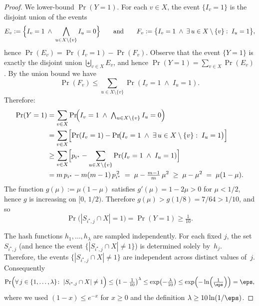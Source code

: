 \begin{proof}
We lower-bound $\Pr(Y=1)$.
For each $v\in X$, the event $\{I_v=1\}$ is the disjoint union of the events
\[
E_v := \Bigl\{I_v = 1 \;\wedge\; \bigwedge_{u\in X\setminus\{v\}} I_u=0\Bigr\}
\qquad\text{and}\qquad
F_v := \bigl\{I_v=1\;\wedge\;\exists\,u\in X\setminus\{v\}:\;I_u=1\bigr\},
\]
hence $\Pr(E_v)=\Pr(I_v=1)-\Pr(F_v)$.
Observe that the event $\{Y=1\}$ is exactly the disjoint union
$\biguplus_{v\in X} E_v$, and hence $\Pr(Y=1)=\sum_{v\in X}\Pr(E_v)$.
By the union bound we have
\[
\Pr(F_v) \le \sum_{u\in X\setminus\{v\}} \Pr(I_v=1\;\wedge\;I_u=1).
\]
Therefore:
\begin{align*}
\Pr(Y=1)
&= \sum_{v\in X} \Pr\!\Bigl(I_v=1 \;\wedge\;
\textstyle\bigwedge_{u\in X\setminus\{v\}} I_u=0\Bigr)\\
&= \sum_{v\in X}\Bigl[\Pr(I_v=1)
- \Pr\!\bigl(I_v=1\;\wedge\;\exists\,u\in X\setminus\{v\}:\;I_u=1\bigr)
\Bigr]\\
&\ge \sum_{v\in X}\Bigl[p_{i^\star}
- \sum_{u\in X\setminus\{v\}} \Pr(I_v=1 \;\wedge\; I_u=1)\Bigr]\\
&= m\,p_{i^\star} - m(m-1)\,p_{i^\star}^{\,2}
\;=\; \mu - \tfrac{m-1}{m}\,\mu^2
\;\ge\; \mu - \mu^2
\;=\; \mu(1-\mu).
\end{align*}
The function $g(\mu):=\mu(1-\mu)$ satisfies $g'(\mu)=1-2\mu > 0$ for
$\mu<1/2$, hence $g$ is increasing on $[0,\,1/2)$.
Therefore $g(\mu) > g(1/8) = 7/64 > 1/10$, and so
\[
\Pr\bigl(|S_{i^\star,j}\cap X|=1\bigr)=\Pr(Y=1)\ge \tfrac{1}{10}.
\]

The hash functions $h_1,\dots,h_\lambda$ are sampled independently.
For each fixed $j$, the set $S_{i^\star,j}$ (and hence the event
$\{|S_{i^\star,j}\cap X|\neq 1\}$) is determined solely by~$h_j$.
Therefore, the events $\{|S_{i^\star,j}\cap X|\neq 1\}$ are independent across
distinct values of~$j$.
Consequently
\[
\Pr\Bigl(\forall\, j\in\{1,\dots,\lambda\}\colon\;
|S_{i^\star,j}\cap X|\neq 1\Bigr)
\le \left(1-\tfrac{1}{10}\right)^\lambda
\le \exp\!\left(-\tfrac{\lambda}{10}\right)
\le \exp\!\left(-\ln\!\left(\tfrac{1}{\eps}\right)\right)
= \eps,
\]
where we used $(1-x)\le e^{-x}$ for $x\ge 0$ and the definition
$\lambda\ge 10\ln(1/\eps)$.


\end{proof}
